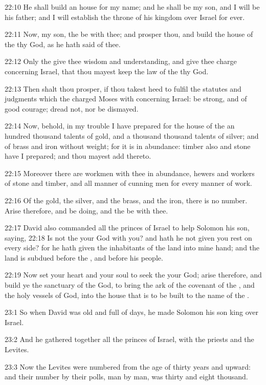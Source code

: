 22:10 He shall build an house for my name; and he shall be my son, and
I will be his father; and I will establish the throne of his kingdom
over Israel for ever.

22:11 Now, my son, the \LORD be with thee; and prosper thou, and build
the house of the \LORD thy God, as he hath said of thee.

22:12 Only the \LORD give thee wisdom and understanding, and give thee
charge concerning Israel, that thou mayest keep the law of the \LORD
thy God.

22:13 Then shalt thou prosper, if thou takest heed to fulfil the
statutes and judgments which the \LORD charged Moses with concerning
Israel: be strong, and of good courage; dread not, nor be dismayed.

22:14 Now, behold, in my trouble I have prepared for the house of the
\LORD an hundred thousand talents of gold, and a thousand thousand
talents of silver; and of brass and iron without weight; for it is in
abundance: timber also and stone have I prepared; and thou mayest add
thereto.

22:15 Moreover there are workmen with thee in abundance, hewers and
workers of stone and timber, and all manner of cunning men for every
manner of work.

22:16 Of the gold, the silver, and the brass, and the iron, there is
no number. Arise therefore, and be doing, and the \LORD be with thee.

22:17 David also commanded all the princes of Israel to help Solomon
his son, saying, 22:18 Is not the \LORD your God with you? and hath he
not given you rest on every side? for he hath given the inhabitants of
the land into mine hand; and the land is subdued before the \LORD, and
before his people.

22:19 Now set your heart and your soul to seek the \LORD your God;
arise therefore, and build ye the sanctuary of the \LORD God, to bring
the ark of the covenant of the \LORD, and the holy vessels of God, into
the house that is to be built to the name of the \LORD.

23:1 So when David was old and full of days, he made Solomon his son
king over Israel.

23:2 And he gathered together all the princes of Israel, with the
priests and the Levites.

23:3 Now the Levites were numbered from the age of thirty years and
upward: and their number by their polls, man by man, was thirty and
eight thousand.

